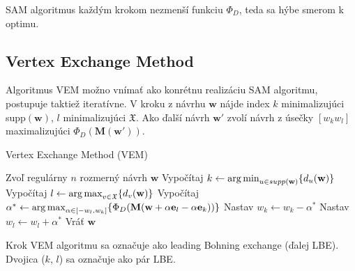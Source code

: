 SAM algoritmus každým krokom nezmenší funkciu $\Phi_D$, teda sa hýbe smerom k optimu.

\subsection{Vertex Exchange Method}

Algoritmus VEM možno vnímať ako konrétnu realizáciu SAM algoritmu, postupuje taktiež iteratívne. V kroku z návrhu $\mathbf w$ nájde index $k$ minimalizujúci supp$(\mathbf w)$, $l$ minimalizujúci $\mathfrak X$. Ako ďalší návrh $\mathbf {w'}$ zvolí návrh z úsečky $[w_kw_l]$ maximalizujúci $\Phi_D(\mathbf {M(w')})$.

\begin{algorithm}[H]
	\caption{Vertex Exchange Method (VEM) \cite{rex_harman}}
	\label{vem}
	\begin{algorithmic}[1]
		\State Zvoľ regulárny $n$ rozmerný návrh $\mathbf w$
			\State Vypočítaj $k \leftarrow \operatorname*{arg\,min}_{u \in supp(\mathbf w)} \{ d_u(\mathbf w)\}$
			\State Vypočítaj $l \leftarrow \operatorname*{arg\,max}_{v \in \mathfrak X} \{ d_v(\mathbf w)\}$
			\State Vypočítaj $\alpha^* \leftarrow \operatorname*{arg\,max}_{\alpha \in [-w_l, w_k]} \{ \Phi_D (\mathbf M(\mathbf w+\alpha \mathbf e_l -\alpha \mathbf e_k))\}$
			\State Nastav $w_k \leftarrow w_k - \alpha^*$
			\State Nastav $w_l \leftarrow w_l + \alpha^*$
		\EndWhile
		\State Vráť $\mathbf w$
	\end{algorithmic}
\end{algorithm}

Krok VEM algoritmu sa označuje ako leading Bohning exchange (ďalej LBE). Dvojica ($k$, $l$) sa označuje ako pár LBE.
